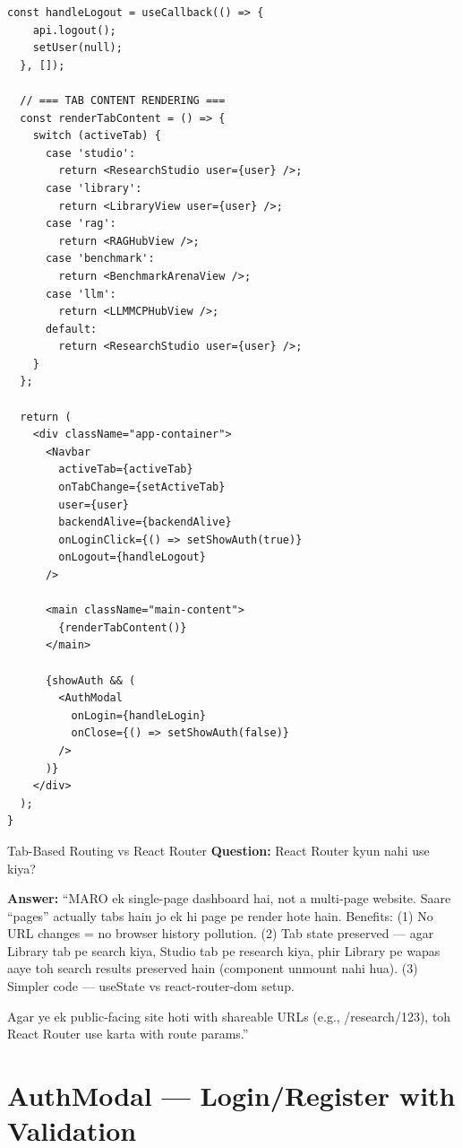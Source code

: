\documentclass[11pt,a4paper,twoside]{report}
\begin{document}
\begin{lstlisting}[style=jsstyle,caption={App.jsx --- Application Shell}]
  const handleLogout = useCallback(() => {
    api.logout();
    setUser(null);
  }, []);

  // === TAB CONTENT RENDERING ===
  const renderTabContent = () => {
    switch (activeTab) {
      case 'studio':
        return <ResearchStudio user={user} />;
      case 'library':
        return <LibraryView user={user} />;
      case 'rag':
        return <RAGHubView />;
      case 'benchmark':
        return <BenchmarkArenaView />;
      case 'llm':
        return <LLMMCPHubView />;
      default:
        return <ResearchStudio user={user} />;
    }
  };

  return (
    <div className="app-container">
      <Navbar
        activeTab={activeTab}
        onTabChange={setActiveTab}
        user={user}
        backendAlive={backendAlive}
        onLoginClick={() => setShowAuth(true)}
        onLogout={handleLogout}
      />

      <main className="main-content">
        {renderTabContent()}
      </main>

      {showAuth && (
        <AuthModal
          onLogin={handleLogin}
          onClose={() => setShowAuth(false)}
        />
      )}
    </div>
  );
}
\end{lstlisting}

\begin{conceptbox}{Tab-Based Routing vs React Router}
\textbf{Question:} React Router kyun nahi use kiya?

\textbf{Answer:} ``MARO ek single-page dashboard hai, not a multi-page website. Saare ``pages'' actually tabs hain jo ek hi page pe render hote hain. Benefits: (1) No URL changes = no browser history pollution. (2) Tab state preserved --- agar Library tab pe search kiya, Studio tab pe research kiya, phir Library pe wapas aaye toh search results preserved hain (component unmount nahi hua). (3) Simpler code --- useState vs react-router-dom setup.

Agar ye ek public-facing site hoti with shareable URLs (e.g., /research/123), toh React Router use karta with route params.''
\end{conceptbox}

\section{AuthModal --- Login/Register with Validation}
\end{document}
